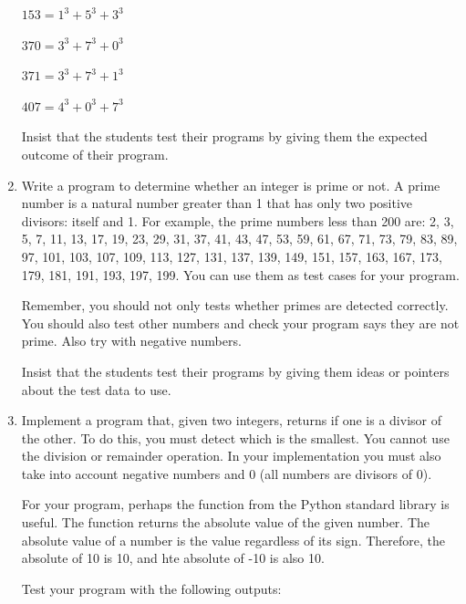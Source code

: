 \documentclass[
  fontsize=10pt,
  a4paper,
]{scrartcl}
\newenvironment{howTILEd}%
  {\begin{mdframed}[skipabove=10pt,skipbelow=10pt,backgroundcolor=pink!40]}%
  {\end{mdframed}}
\begin{document}
\begin{enumerate}
$153=1^3+5^3+3^3$

$370=3^3+7^3+0^3$

$371=3^3+7^3+1^3$

$407=4^3+0^3+7^3$

\begin{howTILEd}
Insist that the students test their programs by giving them the expected outcome of their program.
\end{howTILEd}


\item Write a program to determine whether an integer is prime or not. A prime number is a natural number greater than 1 that has only two positive divisors: itself and 1. For example, the prime numbers less than 200 are:
2, 3, 5, 7, 11, 13, 17, 19, 23, 29, 31, 37, 41, 43, 47, 53, 59, 61, 67, 71, 73, 79, 83, 89, 97, 101, 103, 107, 109, 113, 127, 131, 137, 139, 149, 151, 157, 163, 167, 173, 179, 181, 191, 193, 197, 199. You can use them as test cases for your program. 

Remember, you should not only tests whether primes are detected correctly. You should also test other numbers and check your program says they are not prime. Also try with negative numbers.


\begin{howTILEd}
Insist that the students test their programs by giving them ideas or pointers about the test data to use.
\end{howTILEd}


\item Implement a program that, given two integers, returns if one is a divisor of the other. To do this, you must detect which is the smallest. You cannot use the division or remainder operation. In your implementation you must also take into account negative numbers and 0 (all numbers are divisors of 0).

For your program, perhaps the  function from the Python standard library is useful. The  function returns the absolute value of the given number. The absolute value of a number is the value regardless of its sign. Therefore, the absolute of 10 is 10, and hte absolute of -10 is also 10.

Test your program with the following outputs:


\end{enumerate}
\end{document}
